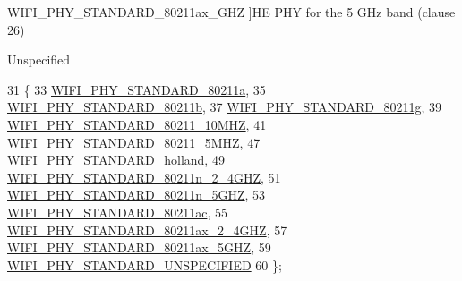 \begin{Desc}
\begin{description}
{W\+I\+F\+I\+\_\+\+P\+H\+Y\+\_\+\+S\+T\+A\+N\+D\+A\+R\+D\+\_\+80211ax\+\_\+G\+HZ\hypertarget{group__wifi_gga1299834f4e1c615af3ca738033b76a49af5b1e598f5b0d88c961c90ad1742355f}{}\label{group__wifi_gga1299834f4e1c615af3ca738033b76a49af5b1e598f5b0d88c961c90ad1742355f}
}]HE P\+HY for the 5 G\+Hz band (clause 26) \item[{\em 
W\+I\+F\+I\+\_\+\+P\+H\+Y\+\_\+\+S\+T\+A\+N\+D\+A\+R\+D\+\_\+\+U\+N\+S\+P\+E\+C\+I\+F\+I\+ED\hypertarget{group__wifi_gga1299834f4e1c615af3ca738033b76a49a95f590f4512ff9645bba0b4f2650f92d}{}\label{group__wifi_gga1299834f4e1c615af3ca738033b76a49a95f590f4512ff9645bba0b4f2650f92d}
}]Unspecified \end{description}
\end{Desc}

\begin{DoxyCode}
31 \{
33   \hyperlink{group__wifi_gga1299834f4e1c615af3ca738033b76a49a22db1e8022db2c3450414b86c77b11e4}{WIFI\_PHY\_STANDARD\_80211a},
35   \hyperlink{group__wifi_gga1299834f4e1c615af3ca738033b76a49a77e1cc9f77a0bce8e2bc82cbef437b5a}{WIFI\_PHY\_STANDARD\_80211b},
37   \hyperlink{group__wifi_gga1299834f4e1c615af3ca738033b76a49aeda6d90f260393ce003ec4765d8100af}{WIFI\_PHY\_STANDARD\_80211g},
39   \hyperlink{group__wifi_gga1299834f4e1c615af3ca738033b76a49aff863c98db467eb76170dc8bbe743de7}{WIFI\_PHY\_STANDARD\_80211\_10MHZ},
41   \hyperlink{group__wifi_gga1299834f4e1c615af3ca738033b76a49a8311083bdd8ae58e73ab6e81a53fd7be}{WIFI\_PHY\_STANDARD\_80211\_5MHZ},
47   \hyperlink{group__wifi_gga1299834f4e1c615af3ca738033b76a49aca926d77ddca0fc6d8cdcb190b2e520e}{WIFI\_PHY\_STANDARD\_holland},
49   \hyperlink{group__wifi_gga1299834f4e1c615af3ca738033b76a49a6e449a5ca14fc7c0eb36064ce04a5192}{WIFI\_PHY\_STANDARD\_80211n\_2\_4GHZ},
51   \hyperlink{group__wifi_gga1299834f4e1c615af3ca738033b76a49aaabe94a0be4668583c42595437b4a6c0}{WIFI\_PHY\_STANDARD\_80211n\_5GHZ},
53   \hyperlink{group__wifi_gga1299834f4e1c615af3ca738033b76a49a7c078959de635b84fb280a955dcfb27e}{WIFI\_PHY\_STANDARD\_80211ac},
55   \hyperlink{group__wifi_gga1299834f4e1c615af3ca738033b76a49a21cd71f16aa85df0b571d52f9217f330}{WIFI\_PHY\_STANDARD\_80211ax\_2\_4GHZ},
57   \hyperlink{group__wifi_gga1299834f4e1c615af3ca738033b76a49af5b1e598f5b0d88c961c90ad1742355f}{WIFI\_PHY\_STANDARD\_80211ax\_5GHZ},
59   \hyperlink{group__wifi_gga1299834f4e1c615af3ca738033b76a49a95f590f4512ff9645bba0b4f2650f92d}{WIFI\_PHY\_STANDARD\_UNSPECIFIED}
60 \};
\end{DoxyCode}
